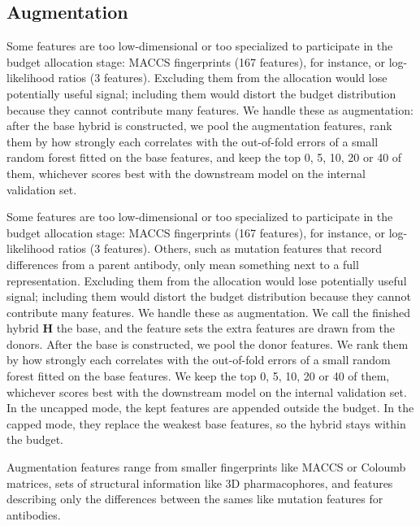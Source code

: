\subsection{Augmentation}

Some features are too low-dimensional or too specialized to participate in the budget allocation stage: MACCS fingerprints (167 features), for instance, or log-likelihood ratios (3 features). Excluding them from the allocation would lose potentially useful signal; including them would distort the budget distribution because they cannot contribute many features. We handle these as augmentation: after the base hybrid is constructed, we pool the augmentation features, rank them by how strongly each correlates with the out-of-fold errors of a small random forest fitted on the base features, and keep the top 0, 5, 10, 20 or 40 of them, whichever scores best with the downstream model on the internal validation set.

Some features are too low-dimensional or too specialized to participate in the budget allocation stage: MACCS fingerprints (167 features), for instance, or log-likelihood ratios (3 features). Others, such as mutation features that record differences from a parent antibody, only mean something next to a full representation. Excluding them from the allocation would lose potentially useful signal; including them would distort the budget distribution because they cannot contribute many features. We handle these as augmentation. We call the finished hybrid $\mathbf{H}$ the base, and the feature sets the extra features are drawn from the donors. After the base is constructed, we pool the donor features. We rank them by how strongly each correlates with the out-of-fold errors of a small random forest fitted on the base features. We keep the top 0, 5, 10, 20 or 40 of them, whichever scores best with the downstream model on the internal validation set. In the uncapped mode, the kept features are appended outside the budget. In the capped mode, they replace the weakest base features, so the hybrid stays within the budget.

Augmentation features range from smaller fingerprints like MACCS or Coloumb matrices, sets of structural information like 3D pharmacophores, and features describing only the differences between the sames like mutation features for antibodies.

